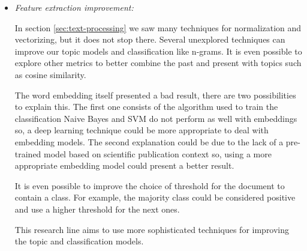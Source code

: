 \begin{itemize}

	\newpage
	\item \textit{Feature extraction improvement:}
	
	In section \ref{sec:text-processing} we saw many techniques for normalization and vectorizing, but it does not stop there. Several unexplored techniques can improve our topic models and classification like n-grams.
	It is even possible to explore other metrics to better combine the past and present with topics such as cosine similarity.

	The word embedding itself presented a bad result, there are two possibilities to explain this. The first one consists of the algorithm used to train the classification Naive Bayes and SVM do not perform as well with embeddings so, a deep learning technique could be more appropriate to deal with embedding models. The second explanation could be due to the lack of a pre-trained model based on scientific publication context so, using a more appropriate embedding model could present a better result.
	
	It is even possible to improve the choice of threshold for the document to contain a class. For example, the majority class could be considered positive and use a higher threshold for the next ones.
	
	This research line aims to use more sophisticated techniques for improving the topic and classification models.
	
	
\end{itemize}
